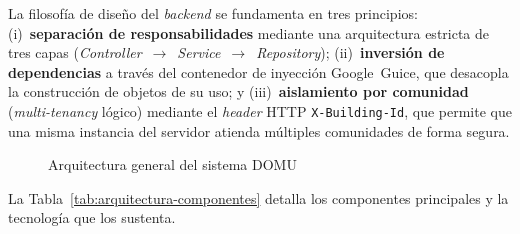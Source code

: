 La filosofía de diseño del \textit{backend} se fundamenta en tres principios: (i)~\textbf{separación de responsabilidades} mediante una arquitectura estricta de tres capas (\textit{Controller}~$\rightarrow$~\textit{Service}~$\rightarrow$~\textit{Repository}); (ii)~\textbf{inversión de dependencias} a través del contenedor de inyección Google~Guice, que desacopla la construcción de objetos de su uso; y (iii)~\textbf{aislamiento por comunidad} (\textit{multi-tenancy} lógico) mediante el \textit{header} HTTP \texttt{X-Building-Id}, que permite que una misma instancia del servidor atienda múltiples comunidades de forma segura.

\begin{figure}[H]
\centering
{}
\caption{Arquitectura general del sistema DOMU}
\label{fig:arquitectura-general-domu}
\end{figure}

La Tabla~\ref{tab:arquitectura-componentes} detalla los componentes principales y la tecnología que los sustenta.

